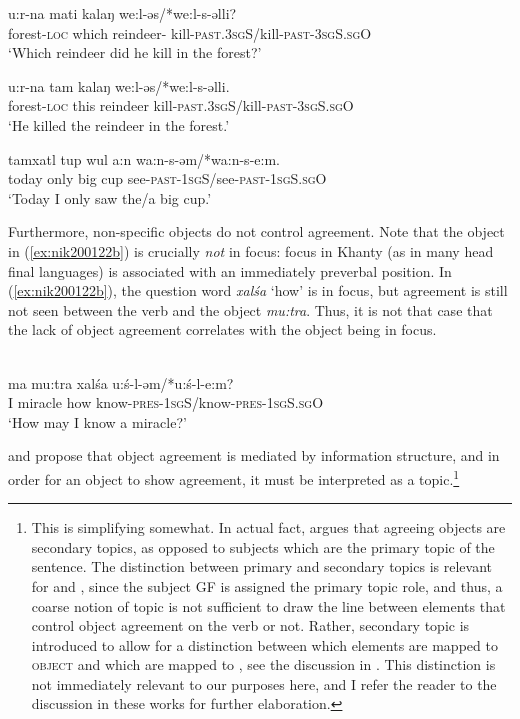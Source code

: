 \documentclass[output=paper
,modfonts
,nonflat]{langsci/langscibook}
\begin{document}
\begin{exe}
\ex \citet[][143]{dn2011}
\begin{xlist}
\ex
{\gll u:r-na mati kalaŋ we:l-əs/*we:l-s-əlli?\\
forest-\textsc{loc} which reindeer- kill-\textsc{past.3sgS}/kill-\textsc{past-3sgS.sgO}\\
\glt `Which reindeer did he kill in the forest?'} \label{ex:focwh}

\ex
{\gll u:r-na tam kalaŋ we:l-əs/*we:l-s-əlli.\\
forest-\textsc{loc} this reindeer kill-\textsc{past.3sgS}/kill-\textsc{past-3sgS.sgO}\\
\glt `He killed the reindeer in the forest.'} \label{ex:focanswer}

\ex
{\gll tamxatl tup wul a:n wa:n-s-əm/*wa:n-s-e:m.\\
today only big cup see-\textsc{past-1sgS}/see-\textsc{past-1sgS.sgO}\\
\glt `Today I only saw the/a big cup.'} \label{ex:focpart}
\end{xlist}
\end{exe}

\noindent Furthermore, non-specific objects do not control agreement.
Note that the object in (\ref{ex:nik200122b}) is crucially \textit{not} in focus: focus in Khanty (as in many head final languages) is associated with an immediately preverbal position.
In (\ref{ex:nik200122b}), the question word \textit{xal\'{s}a} `how' is in focus, but agreement is still not seen between the verb and the object \textit{mu:tra}.
Thus, it is not that case that the lack of object agreement correlates with the object being in focus.

\begin{exe}
\ex \citet[][20]{nikolaeva2001}\\
{\gll ma mu:tra xal\'{s}a u:\'{s}-l-əm/*u:\'{s}-l-e:m?\\
I miracle how know-\textsc{pres-1sgS}/know-\textsc{pres-1sgS.sgO}\\
\glt `How may I know a miracle?'} \label{ex:nik200122b}
\end{exe}


\noindent \citet{nikolaeva2001} and \citet{dn2011} propose that object agreement is mediated by information structure, and in order for an object to show agreement, it must be interpreted as a topic.\footnote{This is simplifying somewhat.
In actual fact, \citet{nikolaeva2001} argues that agreeing objects are secondary topics, as opposed to subjects which are the primary topic of the sentence.
The distinction between primary and secondary topics is relevant for \cite{nikolaeva2001} and \cite{dn2011}, since the subject GF is assigned the primary topic role, and thus, a coarse notion of topic is not sufficient to draw the line between elements that control object agreement on the verb or not.
Rather, secondary topic is introduced to allow for a distinction between which elements are mapped to \textsc{object} and which are mapped to \robj, see the discussion in .
This distinction is not immediately relevant to our purposes here, and I refer the reader to the discussion in these works for further elaboration.}
\end{document}
